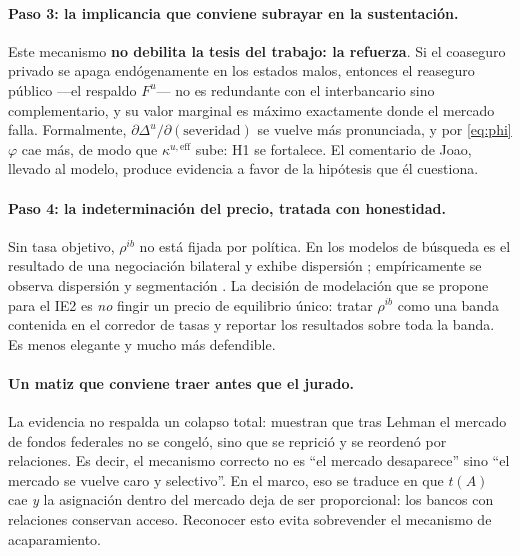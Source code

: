 \documentclass[11pt]{article}
\theoremstyle{definition}
\begin{document}
\paragraph{Paso 3: la implicancia que conviene subrayar en la sustentaci\'on.}
Este mecanismo \textbf{no debilita la tesis del trabajo: la refuerza}. Si el
coaseguro privado se apaga end\'ogenamente en los estados malos, entonces el
reaseguro p\'ublico ---el respaldo $F^u$--- no es redundante con el interbancario
sino complementario, y su valor marginal es m\'aximo exactamente donde el
mercado falla. Formalmente, $\partial\Delta^u/\partial(\text{severidad})$ se
vuelve m\'as pronunciada, y por \eqref{eq:phi} $\varphi$ cae m\'as, de modo que
$\kappa^{u,\mathrm{eff}}$ sube: H1 se fortalece. El comentario de Joao, llevado
al modelo, produce evidencia a favor de la hip\'otesis que \'el cuestiona.

\paragraph{Paso 4: la indeterminaci\'on del precio, tratada con honestidad.} Sin
tasa objetivo, $\rho^{ib}$ no est\'a fijada por pol\'itica. En los modelos de
b\'usqueda es el resultado de una negociaci\'on bilateral y exhibe dispersi\'on
\citep{afonso2015}; emp\'iricamente se observa dispersi\'on y segmentaci\'on
\citep{afonso2011stressed,bechklee2011,ashcraft2011}. La decisi\'on de modelaci\'on
que se propone para el IE2 es \emph{no} fingir un precio de equilibrio \'unico:
tratar $\rho^{ib}$ como una banda contenida en el corredor de tasas y reportar
los resultados sobre toda la banda. Es menos elegante y mucho m\'as defendible.

\paragraph{Un matiz que conviene traer antes que el jurado.} La evidencia no
respalda un colapso total: \citet{afonso2011stressed} muestran que tras Lehman el
mercado de fondos federales no se congel\'o, sino que se reprici\'o y se reorden\'o
por relaciones. Es decir, el mecanismo correcto no es ``el mercado desaparece''
sino ``el mercado se vuelve caro y selectivo''. En el marco, eso se traduce en
que $t(A)$ cae \emph{y} la asignaci\'on dentro del mercado deja de ser
proporcional: los bancos con relaciones conservan acceso. Reconocer esto evita
sobrevender el mecanismo de acaparamiento.
\end{document}
